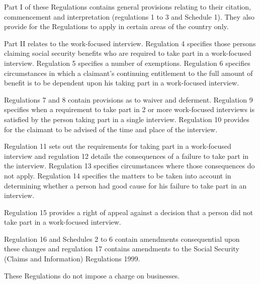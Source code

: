 \documentclass[12pt,a4paper]{article}
\begin{document}
Part I of these Regulations contains general provisions relating to their citation, commencement and interpretation (regulations 1 to 3 and Schedule 1). They also provide for the Regulations to apply in certain areas of the country only.

Part II relates to the work-focused interview. Regulation 4 specifies those persons claiming social security benefits who are required to take part in a work-focused interview. Regulation 5 specifies a number of exemptions. Regulation 6 specifies circumstances in which a claimant’s continuing entitlement to the full amount of benefit is to be dependent upon his taking part in a work-focused interview.

Regulations 7 and 8 contain provisions as to waiver and deferment. Regulation 9 specifies when a requirement to take part in 2 or more work-focused interviews is satisfied by the person taking part in a single interview. Regulation 10 provides for the claimant to be advised of the time and place of the interview.

Regulation 11 sets out the requirements for taking part in a work-focused interview and regulation 12 details the consequences of a failure to take part in the interview. Regulation 13 specifies circumstances where those consequences do not apply. Regulation 14 specifies the matters to be taken into account in determining whether a person had good cause for his failure to take part in an interview.

Regulation 15 provides a right of appeal against a decision that a person did not take part in a work-focused interview.

Regulation 16 and Schedules 2 to 6 contain amendments consequential upon these changes and regulation 17 contains amendments to the Social Security (Claims and Information) Regulations 1999.

These Regulations do not impose a charge on businesses. 
\end{document}

